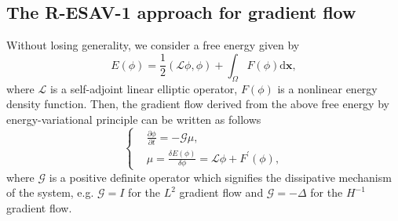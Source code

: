 \documentclass[final,review,onefignum,onetabnum]{siamart190516}
\theoremstyle{plain}
\begin{document}
 \subsection{The R-ESAV-1 approach for gradient flow} 
Without losing generality, we consider a free energy given by  
\begin{equation}
	E(\phi)=\frac{1}{2}(\mathcal{L} \phi, \phi) + \int_{\Omega} F(\phi) \mathrm{d} \boldsymbol{x},
\end{equation}
where $\mathcal{L}$  is a self-adjoint linear  elliptic operator, $F(\phi)$ is a nonlinear energy density function.
Then, the gradient flow derived from the above free energy by energy-variational principle can be written as follows
\begin{equation} \label{eq:gradient-flow-single}
	\left\{\begin{aligned}
		& \frac{\partial \phi}{\partial t}=-\mathcal{G} \mu, \\
		& \mu=\frac{\delta E(\phi)}{\delta \phi}=\mathcal{L} \phi+F^{\prime}(\phi),
	\end{aligned}\right.
\end{equation}
where  $\mathcal{G}$ is a positive definite operator which signifies the dissipative mechanism of the system, e.g. $\mathcal{G}=I$ for the $L^2$ gradient flow and $\mathcal{G}=-\Delta$ for the $H^{-1}$ gradient flow.  
\end{document}
